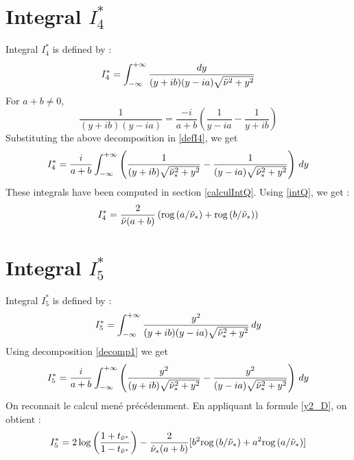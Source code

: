\section{Integral $I_4^*$}
\label{calcI4}
Integral $I_4^*$ is defined by :
\begin{equation}
I_4^*=\int_{-\infty}^{+\infty} \dfrac{dy}{(y+ib)(y-ia)\sqrt{\tilde{\nu}^2+y^2}}
\label{defI4}
\end{equation}
For $a+b\neq0$, 
\begin{equation}
    \frac{1}{(y+ib)(y-ia)}=\frac{-i}{a+b}\left( \frac{1}{y-ia}-\frac{1}{y+ib}\right)
    \label{decomp1}
\end{equation}
Substituting the above decomposition in \eqref{defI4}, we get
\begin{equation}
I_4^*=\frac{i}{a+b} \int_{-\infty}^{+\infty} \left(\frac{1}{(y+ib)\sqrt{\tilde{\nu}_*^2+y^2}}-\frac{1}{(y-ia)\sqrt{\tilde{\nu}_*^2+y^2}} \right)\,dy
\end{equation}
These integrals have been computed in section \ref{calculIntQ}. Using \eqref{intQ}, we get :
\begin{equation}
I_4^*=\frac{2}{\tilde{\nu}(a+b)}\left(\mbox{rog}\left(a/\tilde{\nu}_*\right)+\mbox{rog}\left(b/\tilde{\nu}_*\right) \right)
\label{valI4}
\end{equation}

\section{Integral $I_5^*$}
\label{calcI5}

Integral $I_5^*$ is defined by :
\begin{equation}
I_5^*=\int_{-\infty}^{+\infty} \frac{y^2}{(y+ib)(y-ia)\sqrt{\tilde{\nu}_*^2+y^2}}\,dy
\end{equation}
Using decomposition \eqref{decomp1} we get
$$ I_5^*=\frac{i}{a+b}\int_{-\infty}^{+\infty}\left( \frac{y^2}{(y+ib)\sqrt{\tilde{\nu}^2_*+y^2}}-\frac{y^2}{(y-ia)\sqrt{\tilde{\nu}_*^2+y^2}}\right)\,dy $$
On reconnait le calcul mené précédemment. En appliquant la formule \eqref{y2_D}, on obtient :
\begin{equation}
I_5^*=2\log\left(\frac{1+t_{\tilde{\nu}^*}}{1-t_{\tilde{\nu}^*}}\right)-\frac{2}{\tilde{\nu}_*(a+b)}\lbrack b^2\mbox{rog}\left(b/\tilde{\nu}_*\right)+a^2\mbox{rog}\left(a/\tilde{\nu}_*\right)\rbrack
\label{intI5}
\end{equation}

